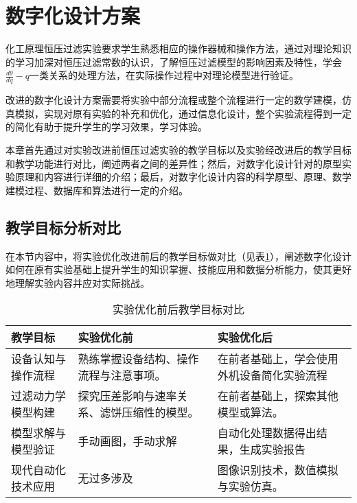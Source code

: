 \documentclass[UTF8,a4paper,fontset=none]{ctexart}
\newcommand{\liuhao}{\fontsize{7.5pt}{9pt}\selectfont}        %
\newcommand{\settableinnerfont}{\liuhao\rmfamily \fontspec{Times New Roman}}
\begin{document}

\section{数字化设计方案}


化工原理恒压过滤实验要求学生熟悉相应的操作器械和操作方法，通过对理论知识的学习加深对恒压过滤常数\textsuperscript{\cite{ref4,ref5}}的认识，了解恒压过滤模型的影响因素及特性，学会$\frac{d \theta}{d q} - q$一类关系的处理方法，在实际操作过程中对理论模型进行验证。

改进的数字化设计方案需要将实验中部分流程或整个流程进行一定的数学建模，仿真模拟，实现对原有实验的补充和优化，通过信息化设计，整个实验流程得到一定的简化有助于提升学生的学习效果，学习体验。

本章首先通过对实验改进前恒压过滤实验的教学目标以及实验经改进后的教学目标和教学功能进行对比，阐述两者之间的差异性；然后，对数字化设计针对的原型实验原理和内容进行详细的介绍；最后，对数字化设计内容的科学原型、原理、数学建模过程、数据库和算法进行一定的介绍。

\subsection{教学目标分析对比}


在本节内容中，将实验优化改进前后的教学目标做对比（见表\ref{tab:vs1}），阐述数字化设计如何在原有实验基础上提升学生的知识掌握、技能应用和数据分析能力，使其更好地理解实验内容并应对实际挑战。

\begin{table}[H]
    \centering
    \caption{实验优化前后教学目标对比}  
    \settableinnerfont
    \label{tab:vs1}
    \begin{tabular}{lll}
        \toprule
        \textbf{教学目标} & \textbf{实验优化前} & \textbf{实验优化后} \\
        \midrule
        设备认知与操作流程 & 熟练掌握设备结构、操作流程与注意事项。 & 在前者基础上，学会使用外机设备简化实验流程 \\
        过滤动力学模型构建 & 探究压差影响与速率关系、滤饼压缩性的模型。 & 在前者基础上，探索其他模型或算法。 \\
        模型求解与模型验证 & 手动画图，手动求解 & 自动化处理数据得出结果，生成实验报告 \\
        现代自动化技术应用 & 无过多涉及 & 图像识别技术，数值模拟与实验仿真。 \\
        \bottomrule
    \end{tabular}
\end{table}
\end{document}
